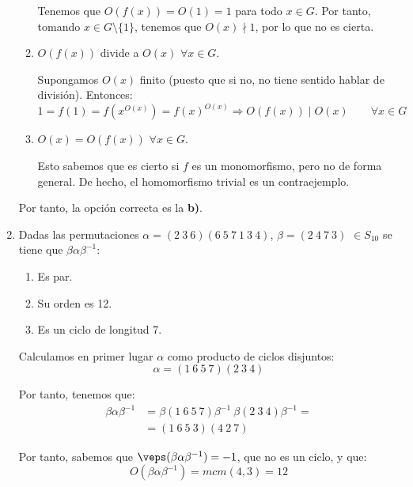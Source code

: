 \documentclass[12pt]{article}
\begin{document}
\begin{ejercicio}
\begin{enumerate}
\begin{enumerate}
                Tenemos que $O(f(x))=O(1)=1$ para todo $x\in G$. Por tanto, tomando $x\in G\setminus \{1\}$, tenemos que $O(x)\nmid 1$, por lo que no es cierta.
                \item $O(f(x))$ divide a $O(x)$ $\forall x \in G$.
                
                Supongamos $O(x)$ finito (puesto que si no, no tiene sentido hablar de división). Entonces:
                \begin{equation*}
                    1 = f(1)=f\left(x^{O(x)}\right)=f(x)^{O(x)}
                    \Longrightarrow O(f(x))\mid O(x)\qquad \forall x\in G
                \end{equation*}
                \item $O(x) = O(f(x))$ $\forall x \in G$.
                
                Esto sabemos que es cierto si $f$ es un monomorfismo, pero no de forma general. De hecho, el homomorfismo trivial es un contraejemplo.
            \end{enumerate}

            Por tanto, la opción correcta es la \textbf{b)}.
            \item Dadas las permutaciones $\alpha = (2\ 3\ 6)(6\ 5\ 7\ 1\ 3\ 4)$, $\beta = (2\ 4\ 7\ 3)$ $\in S_{10}$ se tiene que $\beta\alpha\beta^{-1}$:
            \begin{enumerate}
                \item Es par.
                \item Su orden es 12.
                \item Es un ciclo de longitud 7.
            \end{enumerate}

            Calculamos en primer lugar $\alpha$ como producto de ciclos disjuntos:
            \begin{equation*}
                \alpha=(1\ 6\ 5\ 7)(2\ 3\ 4)
            \end{equation*}

            Por tanto, tenemos que:
            \begin{align*}
                \beta\alpha\beta^{-1}&=\beta(1\ 6\ 5\ 7)\beta^{-1}\ \beta(2\ 3\ 4)\beta^{-1}
                =\\&= (1\ 6\ 5\ 3)(4\ 2\ 7)
            \end{align*}

            Por tanto, sabemos que $\veps(\beta\alpha\beta^{-1})=-1$, que no es un ciclo, y que:
            \begin{equation*}
                O(\beta\alpha\beta^{-1})=mcm(4,3)=12
            \end{equation*}


\end{enumerate}
\end{ejercicio}
\end{document}
